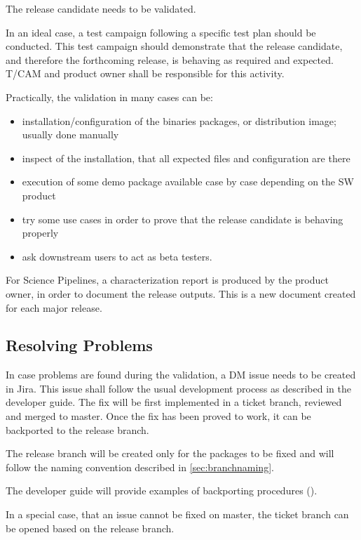 The release candidate needs to be validated.

In an ideal case, a test campaign following a specific test plan should be conducted.
This test campaign should demonstrate that the release candidate, and therefore the forthcoming release, is behaving as required and expected.
T/CAM and product owner shall be responsible for this activity.

Practically, the validation in many cases can be:

\begin{itemize}
\item installation/configuration of the binaries packages, or distribution image; usually done manually
\item inspect of the installation, that all expected files and configuration are there
\item execution of some demo package available case by case depending on the SW product
\item try some use cases in order to prove that the release candidate is behaving properly
\item ask downstream users to act as beta testers.
\end{itemize}

For Science Pipelines, a characterization report is produced by the product owner, in order to document the release outputs.
This is a new document created for each major release.


\subsection{Resolving Problems}

In case problems are found during the validation, a DM issue needs to be created in Jira.
This issue shall follow the usual development process as described in the developer guide.
The fix will be first implemented in a ticket branch, reviewed and merged to master.
Once the fix has been proved to work, it can be backported to the release branch.

The release branch will be created only for the packages to be fixed and will follow the naming convention described in \ref{sec:branchnaming}.

The developer guide will provide examples of backporting procedures ().

In a special case, that an issue cannot be fixed on master, the ticket branch can be opened based on the release branch.

